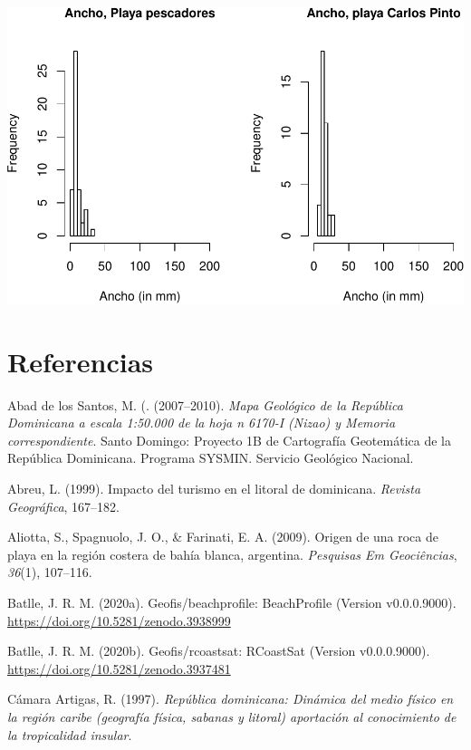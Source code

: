 \documentclass[11pt,]{article}
\begin{document}
\includegraphics{manuscrito_files/figure-latex/unnamed-chunk-6-4.pdf}

\section*{Referencias}\label{referencias}

\hypertarget{refs}{}
\hypertarget{ref-abad2007mapageonizao}{}
Abad de los Santos, M. (. (2007--2010). \emph{Mapa Geológico de la
República Dominicana a escala 1:50.000 de la hoja n 6170-I (Nizao) y
Memoria correspondiente}. Santo Domingo: Proyecto 1B de Cartografía
Geotemática de la República Dominicana. Programa SYSMIN. Servicio
Geológico Nacional.

\hypertarget{ref-abreu1999impacto}{}
Abreu, L. (1999). Impacto del turismo en el litoral de dominicana.
\emph{Revista Geográfica}, 167--182.

\hypertarget{ref-aliotta2009origen}{}
Aliotta, S., Spagnuolo, J. O., \& Farinati, E. A. (2009). Origen de una
roca de playa en la región costera de bahía blanca, argentina.
\emph{Pesquisas Em Geociências}, \emph{36}(1), 107--116.

\hypertarget{ref-jose_ramon_martinez_batlle_2020_3938999}{}
Batlle, J. R. M. (2020a). Geofis/beachprofile: BeachProfile (Version
v0.0.0.9000). \url{https://doi.org/10.5281/zenodo.3938999}

\hypertarget{ref-jose_ramon_martinez_batlle_2020_3937481}{}
Batlle, J. R. M. (2020b). Geofis/rcoastsat: RCoastSat (Version
v0.0.0.9000). \url{https://doi.org/10.5281/zenodo.3937481}

\hypertarget{ref-camara1997republica}{}
Cámara Artigas, R. (1997). \emph{República dominicana: Dinámica del
medio físico en la región caribe (geografía física, sabanas y litoral)
aportación al conocimiento de la tropicalidad insular}.
\end{document}
